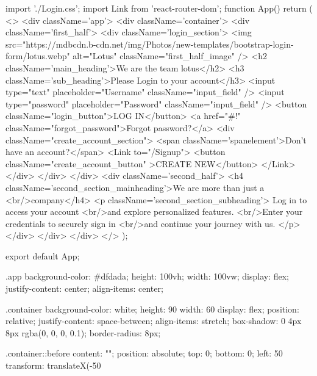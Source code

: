 import './Login.css';
import {  Link } from 'react-router-dom';
function App() {
  return (
    <>
      <div className='app'>
        <div className='container'>
          <div className='first_half'>
            <div className='login_section'>
              <img 
                src="https://mdbcdn.b-cdn.net/img/Photos/new-templates/bootstrap-login-form/lotus.webp" 
                alt="Lotus"
                className="first_half_image"
              />
              <h2 className='main_heading'>We are the team lotus</h2>
              <h3 className='sub_heading'>Please Login to your account</h3>
              <input type="text" placeholder="Username" className="input_field" />
              <input type="password" placeholder="Password" className="input_field" />
              <button className="login_button">LOG IN</button>
              <a href="#!" className="forgot_password">Forgot password?</a>
              <div className="create_account_section">
                <span className='spanelement'>Don't have an account?</span>
                <Link to="/Signup">
                <button className="create_account_button" >CREATE NEW</button>
                </Link>
              </div>
            </div>
          </div>
          <div className='second_half'>
            <h4 className='second_section_mainheading'>We are more than just a <br/>company</h4>
             <p className='second_section_subheading'>
             Log in to access your account <br/>and explore personalized features. <br/>Enter your credentials to securely sign in <br/>and continue your journey with us.
             </p>
          </div>
        </div>
      </div>
    </>
  );
}

export default App;












.app {
    background-color: #dfdada; 
    height: 100vh; 
    width: 100vw; 
    display: flex; 
    justify-content: center; 
    align-items: center; 
  }
  
  .container {
    background-color: white; 
    height: 90%
    width: 60%
    display: flex; 
    position: relative; 
    justify-content: space-between; 
    align-items: stretch; 
    box-shadow: 0 4px 8px rgba(0, 0, 0, 0.1); 
    border-radius: 8px; 
  }
  
  .container::before {
    content: "";
    position: absolute;
    top: 0;
    bottom: 0;
    left: 50%
    transform: translateX(-50%
  }
  

